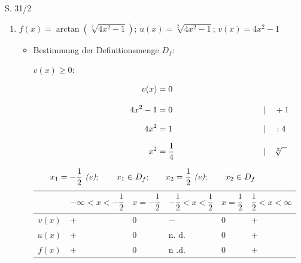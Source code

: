 \begin{Exercise}{S. 31/2}{}
\begin{enumerate}
\begin{enumerate}[label=\alph*)]
{                }
            \item[d)] {
                $f(x) = \arctan\left(\sqrt[2]{4x^{2} -1}\right)$; \qquad $u(x) = \sqrt[2]{4x^{2} -1}$; \qquad $v(x) = 4x^{2} -1$ \\[-2.0ex]
                \begin{itemize}[leftmargin=*]
                    \item Bestimmung der Definitionsmenge $D_{f}$: \\[1.0ex]{
                        $v(x) \geq 0:$\\[-2.0ex]
                        \begin{minipage}[t]{1.0\linewidth}
                            \vspace{-2.0ex}
                            \begin{align*}
                                v(x) &= 0 &&\\[2.0ex]
                                4x^{2} - 1 &= 0 &&| \quad + 1\\[1.5ex]
                                4x^{2} &= 1 &&| \quad :4\\[1.5ex]
                                x^{2} &= \dfrac{1}{4} &&| \quad \sqrt[2]{\phantom{x}}\\[1.5ex]
                                x_{1} = -\dfrac{1}{2} \ \text{\textit{(e)}}; \qquad x_{1} \in D_{f}; \quad & \quad x_{2} = \dfrac{1}{2} \ \text{\textit{(e)}}; \qquad x_{2} \in D_{f} &&\\[-1.0ex]
                            \end{align*}
                        \end{minipage}
                        \begin{minipage}[t]{1.0\linewidth}
                            \begin{tabularx}{0.95\linewidth}{c|X|X|X|X|X}
                                & $-\infty < x < -\dfrac{1}{2}$ & $x = -\dfrac{1}{2}$ & $-\dfrac{1}{2} < x < \dfrac{1}{2}$ & $x = \dfrac{1}{2}$ & $ \dfrac{1}{2} < x < \infty$ \\ \hline
                                $v(x)$ & $+$ & $0$ & $-$ & $0$ & $+$ \\ \hline
                                $u(x)$ & $+$ & $0$ & n. d. & $0$ & $+$ \\ \hline
                                $f(x)$ & $+$ & $0$ & n .d. & $0$ & $+$ \\              
                            \end{tabularx}  
                        \end{minipage}\\[3.0ex]
}
\end{itemize}}
\end{enumerate}
\end{enumerate}
\end{Exercise}
